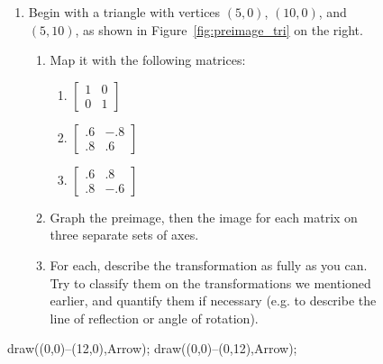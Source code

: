 \documentclass[../gatm.tex]{subfiles}
\begin{document}
\newcommand{\mtrxtbt}[4] {$\left[\begin{array}{cc}#1 & #2 \\ #3 & #4 \end{array}\right]$}

\begin{figure}[h]
	\begin{center}
		\begin{minipage}[c]{0.55\textwidth}
			\begin{enumerate}
				\setcounter{enumi}{\value{mp_problem_i}}
				\item Begin with a triangle with vertices $(5,0)$, $(10,0)$, and $(5,10)$, as shown in Figure~\ref{fig:preimage_tri} on the right.
				\begin{enumerate}
					\item Map it with the following matrices:
					\begin{multicols}{3}
						\begin{enumerate}
							\item $\left[\begin{array}{cc}1 & 0 \\ 0 & 1 \end{array}\right]$
							\item $\left[\begin{array}{cc}.6 & -.8 \\ .8 & .6 \end{array}\right]$
							\item $\left[\begin{array}{cc}.6 & .8 \\ .8 & -.6 \end{array}\right]$
						\end{enumerate}
					\end{multicols}
					\item Graph the preimage, then the image for each matrix on three separate sets of axes.
					\item For each, describe the transformation as fully as you can. Try to classify them on the transformations we mentioned earlier, and quantify them if necessary (e.g. to describe the line of reflection or angle of rotation).
				\end{enumerate}
				\setcounter{mp_problem_i}{\value{enumi}}
			\end{enumerate}
		\end{minipage}
		\hfill
		\begin{minipage}[c]{0.35\textwidth}
			\begin{center}
				\begin{minipage}[b]{\textwidth}
					\centering
					\begin{asy}[width=0.7\textwidth]
						draw((0,0)--(12,0),Arrow);
						draw((0,0)--(0,12),Arrow);
						

\end{asy}
\end{minipage}
\end{center}
\end{minipage}
\end{center}
\end{figure}
\end{document}
